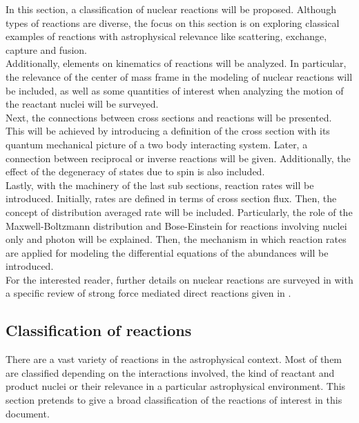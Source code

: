 \documentclass[openany]{book}
\begin{document}
In this section, a classification of nuclear reactions will be proposed. Although types of reactions are diverse, the focus on this section is on exploring classical examples of reactions with astrophysical relevance like scattering, exchange, capture and fusion. \\

Additionally, elements on kinematics of reactions will be analyzed. In particular, the relevance of the center of mass frame in the modeling of nuclear reactions will be included, as well as some quantities of interest when analyzing the motion of the reactant nuclei will be surveyed.  \\

Next, the connections between cross sections and reactions will be presented. This will be achieved by introducing a definition of the cross section with its quantum mechanical picture of a two body interacting system. Later, a connection between reciprocal or inverse reactions will be given. Additionally, the effect of the degeneracy of states due to spin is also included.  \\

Lastly, with the machinery of the last sub sections, reaction rates will be introduced. Initially, rates are defined in terms of cross section flux. Then, the concept of distribution averaged rate will be included. Particularly, the role of the Maxwell-Boltzmann distribution and Bose-Einstein for reactions involving nuclei only and photon will be explained. Then, the mechanism in which reaction rates are applied for modeling the differential equations of the abundances will be introduced.  \\

For the interested reader, further details on nuclear reactions are surveyed in \cite{bertulani_2010} with a specific review of strong force mediated direct reactions given in  \cite{bertulani_bonaccorso_2022}. \\

\subsection{Classification of reactions} \label{sub:classificationReactions}

There are a vast variety of reactions in the astrophysical context. Most of them are classified depending on the interactions involved, the kind of reactant and product nuclei or their relevance in a particular astrophysical environment. This section pretends to give a broad classification of the reactions of interest in this document.\\ 
\end{document}
